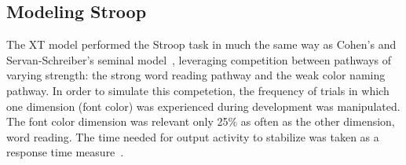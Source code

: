 
\subsection{Modeling Stroop} 



The XT model performed the Stroop task in much the same way as Cohen's and Servan-Schreiber's seminal model~\cite{CohenJD:1990:Stroop}, leveraging competition between pathways of varying strength: the strong word reading pathway and the weak color naming pathway. In order to simulate this competetion, the frequency of trials in which one dimension (font color) was experienced during development was manipulated. The font color dimension was relevant only 25\% as often as the other dimension, word reading. The time needed for output activity to stabilize was taken as a response time measure~\cite{RougierNP:2005:XT}.

